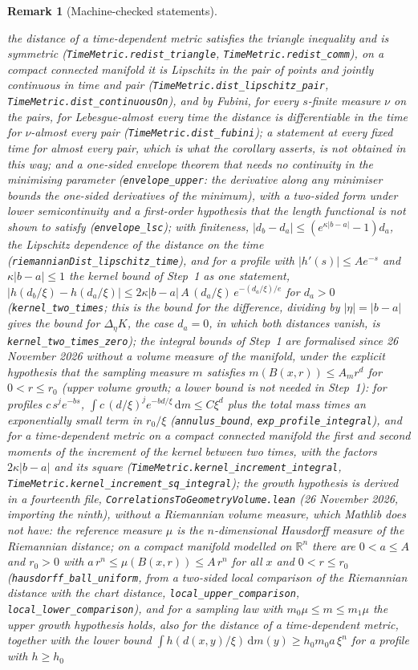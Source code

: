 \documentclass[11pt,a4paper]{article}
\theoremstyle{stmt}
\theoremstyle{defn}
\theoremstyle{rmk}
\newtheorem{remark}[theorem]{Remark}
\numberwithin{equation}{section}
\newcommand{\R}{\mathbb{R}}
\newcommand{\dd}{\mathrm{d}}
\begin{document}
{\begin{remark}[Machine-checked statements]
\begin{itemize}
the distance of a time-dependent metric satisfies the triangle inequality and is symmetric (\texttt{TimeMetric.redist\_triangle}, \texttt{TimeMetric.redist\_comm}), on a compact connected manifold it is Lipschitz in the pair of points and jointly continuous in time and pair (\texttt{TimeMetric.dist\_lipschitz\_pair}, \texttt{TimeMetric.dist\_continuousOn}), and by Fubini, for every $s$-finite measure $\nu$ on the pairs, for Lebesgue-almost every time the distance is differentiable in the time for $\nu$-almost every pair (\texttt{TimeMetric.dist\_fubini}); a statement at every \emph{fixed} time for almost every pair, which is what the corollary asserts, is not obtained in this way; and a one-sided envelope theorem that needs no continuity in the minimising parameter (\texttt{envelope\_upper}: the derivative along any minimiser bounds the one-sided derivatives of the minimum), with a two-sided form under lower semicontinuity and a first-order hypothesis that the length functional is not shown to satisfy (\texttt{envelope\_lsc}); with finiteness, $|d_b-d_a|\le(e^{\kappa|b-a|}-1)d_a$, the Lipschitz dependence of the distance on the time (\texttt{riemannianDist\_lipschitz\_time}), and for a profile with $|h'(s)|\le Ae^{-s}$ and $\kappa|b-a|\le1$ the kernel bound of Step~1 as one statement, $|h(d_b/\xi)-h(d_a/\xi)|\le2\kappa|b-a|\,A\,(d_a/\xi)\,e^{-(d_a/\xi)/e}$ for $d_a>0$ (\texttt{kernel\_two\_times}; this is the bound for the difference, dividing by $|\eta|=|b-a|$ gives the bound for $\Delta_\eta K$, the case $d_a=0$, in which both distances vanish, is \texttt{kernel\_two\_times\_zero}); the integral bounds of Step~1 are formalised since 26 November 2026 without a volume measure of the manifold, under the explicit hypothesis that the sampling measure $m$ satisfies $m(B(x,r))\le A_mr^d$ for $0<r\le r_0$ (upper volume growth; a lower bound is not needed in Step~1): for profiles $c\,s^je^{-bs}$, $\int c\,(d/\xi)^je^{-bd/\xi}\,\dd m\le C\xi^d$ plus the total mass times an exponentially small term in $r_0/\xi$ (\texttt{annulus\_bound}, \texttt{exp\_profile\_integral}), and for a time-dependent metric on a compact connected manifold the first and second moments of the increment of the kernel between two times, with the factors $2\kappa|b-a|$ and its square (\texttt{TimeMetric.kernel\_increment\_integral}, \texttt{TimeMetric.kernel\_increment\_sq\_integral}); the growth hypothesis is derived in a fourteenth file, \texttt{CorrelationsToGeometryVolume.lean} (26 November 2026, importing the ninth), without a Riemannian volume measure, which Mathlib does not have: the reference measure $\mu$ is the $n$-dimensional Hausdorff measure of the Riemannian distance; on a compact manifold modelled on $\R^n$ there are $0<a\le A$ and $r_0>0$ with $a\,r^n\le\mu(B(x,r))\le A\,r^n$ for all $x$ and $0<r\le r_0$ (\texttt{hausdorff\_ball\_uniform}, from a two-sided local comparison of the Riemannian distance with the chart distance, \texttt{local\_upper\_comparison}, \texttt{local\_lower\_comparison}), and for a sampling law with $m_0\mu\le m\le m_1\mu$ the upper growth hypothesis holds, also for the distance of a time-dependent metric, together with the lower bound $\int h(d(x,y)/\xi)\,\dd m(y)\ge h_0m_0a\,\xi^n$ for a profile with $h\ge h_0$ 
\end{itemize}
\end{remark}}
\end{document}
